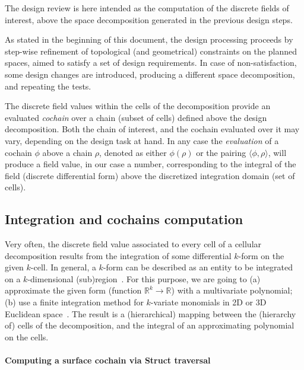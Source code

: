 \documentclass[11pt,oneside]{article}    %
\def\R{\mathbb{R}}
\begin{document}
The design review is here intended as the computation of the discrete fields of interest,
above the space decomposition generated in the previous design steps. 

As stated in the beginning of this document, the design processing proceeds by step-wise refinement 
of topological (and geometrical) constraints on the planned spaces, aimed to satisfy
a set of design requirements. In case of non-satisfaction, some design changes are introduced, producing a different space decomposition, and repeating the tests.

The discrete field values within the cells of the decomposition provide an evaluated \emph{cochain} over 
a chain (subset of cells) defined above the design decomposition. Both the chain of interest, and the cochain evaluated over it may vary, depending on the design task at hand. In any case the \emph{evaluation} of a cochain $\phi$ above a chain $\rho$, denoted as either $\phi(\rho)$ or the pairing $\langle \phi,\rho \rangle$, will produce a field value, in our case a number, corresponding to the integral of the field (discrete differential form) above the discretized integration domain (set of cells).

\subsection{Integration and cochains computation}

Very often, the discrete field value associated to every cell of a cellular decomposition  results from the integration  of some differential $k$-form on the given $k$-cell.  In general, a $k$-form can be described as an entity to be integrated on a $k$-dimensional (sub)region~\cite{Desbrun:2005:DDF:1198555.1198666}.
For this purpose, we are going to  (a)  approximate the given form (function $\R^k \to \R$) with a multivariate polynomial;
(b)    use a finite integration method for $k$-variate monomials in 2D or 3D Euclidean space~\cite{CattaniP-BIL1990}.
The result is a (hierarchical) mapping between the (hierarchy of) cells of the decomposition, and the integral of an approximating polynomial on the cells.

\paragraph{Computing a surface cochain via Struct traversal}
\end{document}
